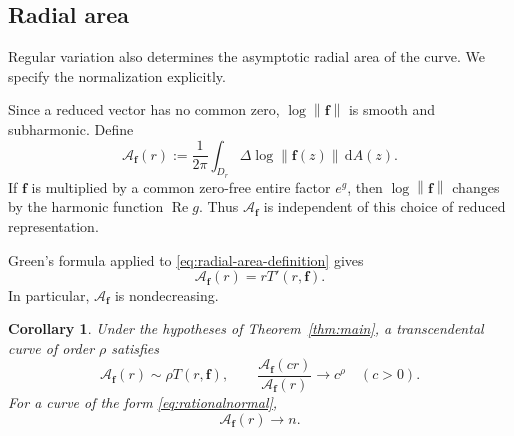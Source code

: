 \documentclass[12pt,letterpaper,reqno]{amsart}
\newtheorem{cor}[thm]{Corollary}
\theoremstyle{definition}
\numberwithin{equation}{section}
\newcommand{\norm}[1]{\left\lVert#1\right\rVert}
\DeclareMathOperator{\Ree}{Re}
\newcommand{\fv}{\bm f}
\begin{document}
\subsection{Radial area}

Regular variation also determines the asymptotic radial area of the
curve. We specify the normalization explicitly.

Since a reduced vector has no common zero,
\(\log\norm{\fv}\) is smooth and subharmonic. Define
\begin{equation}\label{eq:radial-area-definition}
 \mathcal A_{\fv}(r)
 :=
 \frac1{2\pi}
 \int_{D_r}
 \Delta\log\norm{\fv(z)}\,\mathrm dA(z).
\end{equation}
If \(\fv\) is multiplied by a common zero-free entire factor
\(e^g\), then \(\log\norm{\fv}\) changes by the harmonic function
\(\Ree g\). Thus \(\mathcal A_{\fv}\) is independent of this choice of
reduced representation.

Green's formula applied to
\eqref{eq:radial-area-definition} gives
\begin{equation}\label{eq:area-derivative}
 \mathcal A_{\fv}(r)
 =
 rT'(r,\fv).
\end{equation}
In particular, \(\mathcal A_{\fv}\) is nondecreasing.

\begin{cor}\label{cor:area}
Under the hypotheses of Theorem~\ref{thm:main}, a transcendental curve
of order \(\rho\) satisfies
\begin{equation}\label{eq:area-asymptotics}
 \mathcal A_{\fv}(r)
 \sim
 \rho T(r,\fv),
 \qquad
 \frac{\mathcal A_{\fv}(cr)}
      {\mathcal A_{\fv}(r)}
 \longrightarrow
 c^\rho
 \quad(c>0).
\end{equation}
For a curve of the form \eqref{eq:rationalnormal},
\[
\mathcal A_{\fv}(r)\longrightarrow n.
\]
\end{cor}
\end{document}
